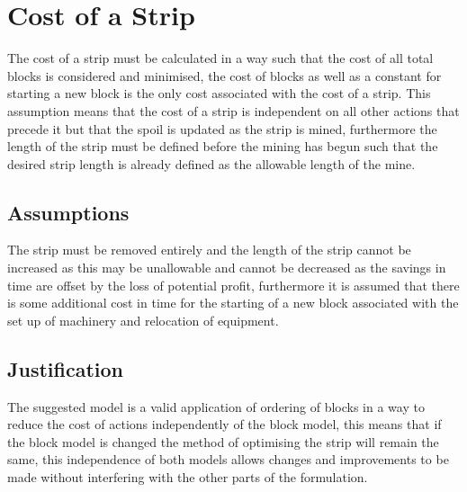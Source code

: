 \section{Cost of a Strip}
The cost of a strip must be calculated in a way such that the cost of all total blocks is considered and minimised, the cost of blocks as well as a constant for starting a new block is the only cost associated with the cost of a strip. This assumption means that the cost of a strip is independent on all other actions that precede it but that the spoil is updated as the strip is mined, furthermore the length of the strip must be defined before the mining has begun such that the desired strip length is already defined as the allowable length of the mine. 
\subsection{Assumptions} 
The strip must be removed entirely and the length of the strip cannot be increased as this may be unallowable and cannot be decreased as the savings in time are offset by the loss of potential profit, furthermore it is assumed that there is some additional cost in time for the starting of a new block associated with the set up of machinery and relocation of equipment. 
\subsection{Justification}
The suggested model is a valid application of ordering of blocks in a way to reduce the cost of actions independently of the block model, this means that if the block model is changed the method of optimising the strip will remain the same, this independence of both models allows changes and improvements to be made without interfering with the other parts of the formulation. 

